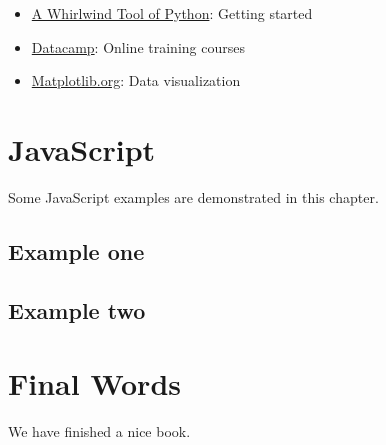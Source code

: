 \documentclass[]{book}
\providecommand{\tightlist}{%
  \setlength{\itemsep}{0pt}\setlength{\parskip}{0pt}}
\begin{document}
\begin{itemize}
\tightlist
\item
  \href{https://jakevdp.github.io/WhirlwindTourOfPython/00-introduction.html}{A Whirlwind Tool of Python}: Getting started
\item
  \href{https://datacamp.com}{Datacamp}: Online training courses
\item
  \href{http://matplotlib.org}{Matplotlib.org}: Data visualization
\end{itemize}

\hypertarget{javascript}{%
\chapter{JavaScript}\label{javascript}}

Some JavaScript examples are demonstrated in this chapter.

\hypertarget{example-one}{%
\section{Example one}\label{example-one}}

\hypertarget{example-two}{%
\section{Example two}\label{example-two}}

\hypertarget{final-words}{%
\chapter{Final Words}\label{final-words}}

We have finished a nice book.


\end{document}
